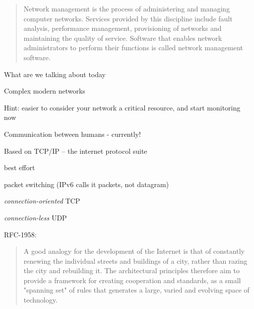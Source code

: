 \documentclass[Screen16to9,17pt]{foils}
\begin{document}

\begin{quote}
Network management is the process of administering and managing computer networks. Services provided by this discipline include fault analysis, performance management, provisioning of networks and maintaining the quality of service. Software that enables network administrators to perform their functions is called network management software.\\
\end{quote}


\begin{list2}
\item What are we talking about today
\item Complex modern networks

\item Hint: easier to consider your network a critical resource, and start monitoring now
\end{list2}



\begin{list1}
\item Communication between humans - currently!
\item Based on TCP/IP -- the internet protocol suite
\begin{list2}
\item best effort
\item packet switching (IPv6 calls it packets, not datagram)
\item \emph{connection-oriented} TCP
\item \emph{connection-less} UDP
\end{list2}
\end{list1}

RFC-1958:
\begin{quote}
 A good analogy for the development of the Internet is that of
 constantly renewing the individual streets and buildings of a city,
 rather than razing the city and rebuilding it. The architectural
 principles therefore aim to provide a framework for creating
 cooperation and standards, as a small "spanning set" of rules that
 generates a large, varied and evolving space of technology.
\end{quote}

\end{document}
